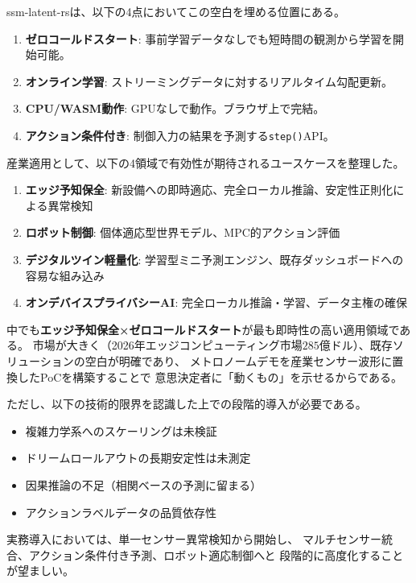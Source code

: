 \documentclass[11pt,a4paper]{ltjsarticle}
\begin{document}
ssm-latent-rsは、以下の4点においてこの空白を埋める位置にある。

\begin{enumerate}
  \item \textbf{ゼロコールドスタート}: 事前学習データなしでも短時間の観測から学習を開始可能。
  \item \textbf{オンライン学習}: ストリーミングデータに対するリアルタイム勾配更新。
  \item \textbf{CPU/WASM動作}: GPUなしで動作。ブラウザ上で完結。
  \item \textbf{アクション条件付き}: 制御入力の結果を予測する\texttt{step()}API。
\end{enumerate}

産業適用として、以下の4領域で有効性が期待されるユースケースを整理した。

\begin{enumerate}
  \item \textbf{エッジ予知保全}: 新設備への即時適応、完全ローカル推論、安定性正則化による異常検知
  \item \textbf{ロボット制御}: 個体適応型世界モデル、MPC的アクション評価
  \item \textbf{デジタルツイン軽量化}: 学習型ミニ予測エンジン、既存ダッシュボードへの容易な組み込み
  \item \textbf{オンデバイスプライバシーAI}: 完全ローカル推論・学習、データ主権の確保
\end{enumerate}

中でも\textbf{エッジ予知保全×ゼロコールドスタート}が最も即時性の高い適用領域である。
市場が大きく（2026年エッジコンピューティング市場$285$億ドル）、既存ソリューションの空白が明確であり、
メトロノームデモを産業センサー波形に置換したPoCを構築することで
意思決定者に「動くもの」を示せるからである。

ただし、以下の技術的限界を認識した上での段階的導入が必要である。

\begin{itemize}
  \item 複雑力学系へのスケーリングは未検証
  \item ドリームロールアウトの長期安定性は未測定
  \item 因果推論の不足（相関ベースの予測に留まる）
  \item アクションラベルデータの品質依存性
\end{itemize}

実務導入においては、単一センサー異常検知から開始し、
マルチセンサー統合、アクション条件付き予測、ロボット適応制御へと
段階的に高度化することが望ましい。
\end{document}
